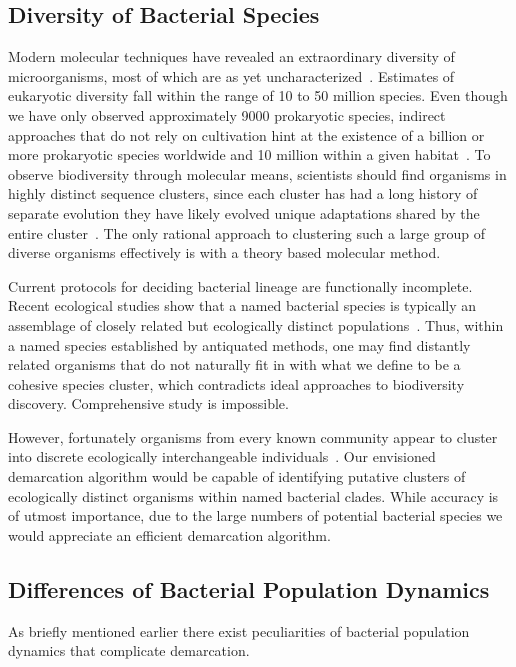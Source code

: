 \subsection{Diversity of Bacterial Species}
Modern molecular techniques have revealed an extraordinary diversity of microorganisms, most of which are as yet uncharacterized~\cite{bohannan2003new}.
Estimates of eukaryotic diversity fall within the range of 10 to 50 million species. Even though we have only observed approximately 9000 prokaryotic species, indirect approaches that do not rely on cultivation hint at the existence of a billion or more prokaryotic species worldwide and 10 million within a given habitat~\cite{cohan2008origins}.
To observe biodiversity through molecular means, scientists should find organisms in highly distinct sequence clusters, since each cluster has had a long history of separate evolution they have likely evolved unique adaptations shared by the entire cluster~\cite{cohan2007systematics}.
The only rational approach to clustering such a large group of diverse organisms effectively is with a theory based molecular method.

Current protocols for deciding bacterial lineage are functionally incomplete. Recent ecological studies show that a named bacterial species is typically an assemblage of closely related but ecologically distinct populations~\cite{cohan2007systematics}.
Thus, within a named species established by antiquated methods, one may find distantly related organisms that do not naturally fit in with what we define to be a cohesive species cluster, which contradicts ideal approaches to biodiversity discovery.
Comprehensive study is impossible.

However, fortunately organisms from every known community appear to cluster into discrete ecologically interchangeable individuals~\cite{cohan2007systematics}.
Our envisioned demarcation algorithm would be capable of identifying putative clusters of ecologically distinct organisms within named bacterial clades.
While accuracy is of utmost importance, due to the large numbers of potential bacterial species we would appreciate an efficient demarcation algorithm.

\subsection{Differences of Bacterial Population Dynamics}
As briefly mentioned earlier there exist peculiarities of bacterial population dynamics that complicate demarcation.

